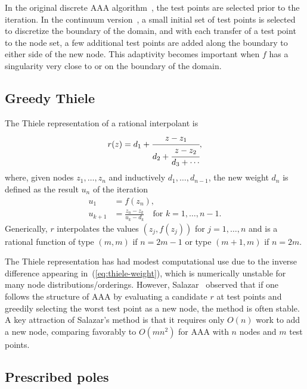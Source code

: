 \documentclass{juliacon}
\begin{document}
In the original discrete AAA algorithm~\cite{nakatsukasaAAAAlgorithm2018}, the test points are selected prior to the iteration. In the continuum version~\cite{driscollAAARational2024}, a small initial set of test points is selected to discretize the boundary of the domain, and with each transfer of a test point to the node set, a few additional test points are added along the boundary to either side of the new node. This adaptivity becomes important when $f$ has a singularity very close to or on the boundary of the domain.

\subsection{Greedy Thiele}
\label{sec:thiele}

The Thiele representation of a rational interpolant is~\cite{celisAdaptiveThiele2023,milne-thompsonCalculusFinite1933}
\begin{equation}
    \label{eq:thiele}
    r(z) = d_1 + \cfrac{z - z_1}{d_2 + \cfrac{z - z_2}{d_3 + \cdots}},
\end{equation}
where, given nodes $z_1,\ldots , z_n$ and inductively $d_1,\ldots,d_{n-1}$, the new weight $d_n$ is defined as the result $u_n$ of the iteration
\begin{equation}
    \label{eq:thiele-weight}
    \begin{split}
        u_1 &= f(z_n), \\
        u_{k+1} &= \frac{z_n - z_k}{u_k - d_k} \quad \text{for } k=1,\ldots,n-1.
    \end{split}
\end{equation}
Generically, $r$ interpolates the values $(z_j,f(z_j))$ for $j=1,\ldots, n$ and is a rational function of type $(m,m)$ if $n=2m-1$ or type $(m+1,m)$ if $n=2m$. 

The Thiele representation has had modest computational use due to the inverse difference appearing in~(\ref{eq:thiele-weight}), which is numerically unstable for many node distributions/orderings. However, Salazar~\cite{celisAdaptiveThiele2023,celisNumericalContinued2024} observed that if one follows the structure of AAA by evaluating a candidate $r$ at test points and greedily selecting the worst test point as a new node, the method is often stable. A key attraction of Salazar's method is that it requires only $O(n)$ work to add a new node, comparing favorably to $O(mn^2)$ for AAA with $n$ nodes and $m$ test points.

\subsection{Prescribed poles}
\label{sec:parfrac}
\end{document}
